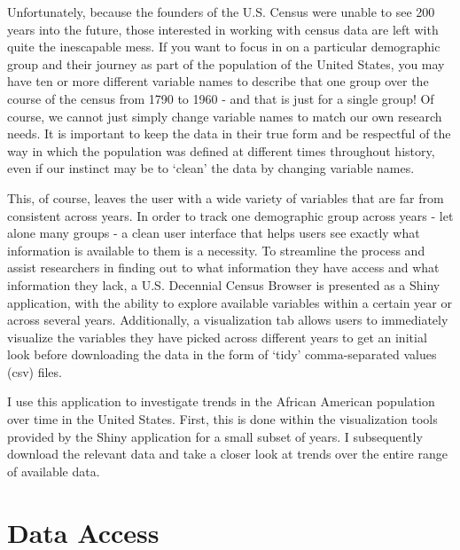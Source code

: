\documentclass[DIV=calc, paper=a4, fontsize=10pt, twocolumn]{scrartcl}\usepackage[]{graphicx}\usepackage[]{color}
\begin{document}
\par Unfortunately, because the founders of the U.S. Census were unable to see 200 years into the future, those interested in working with census data are left with quite the inescapable mess. If you want to focus in on a particular demographic group and their journey as part of the population of the United States, you may have ten or more different variable names to describe that one group over the course of the census from 1790 to 1960 - and that is just for a single group! Of course, we cannot just simply change variable names to match our own research needs. It is important to keep the data in their true form and be respectful of the way in which the population was defined at different times throughout history, even if our instinct may be to `clean' the data by changing variable names.  

\par This, of course, leaves the user with a wide variety of variables that are far from consistent across years. In order to track one demographic group across years - let alone many groups - a clean user interface that helps users see exactly what information is available to them is a necessity. To streamline the process and assist researchers in finding out to what information they have access and what information they lack, a U.S. Decennial Census Browser is presented as a Shiny application, with the ability to explore available variables within a certain year or across several years. Additionally, a visualization tab allows users to immediately visualize the variables they have picked across different years to get an initial look before downloading the data in the form of `tidy' comma-separated values (csv) files.  

\par I use this application to investigate trends in the African American population over time in the United States. First, this is done within the visualization tools provided by the Shiny application for a small subset of years. I subsequently download the relevant data and take a closer look at trends over the entire range of available data.  


\section*{Data Access}
\end{document}
